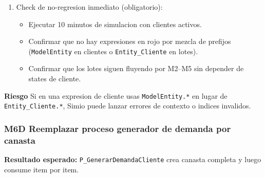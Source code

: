 \documentclass[11pt]{article}
\newcommand{\simio}[1]{\texttt{#1}}
\newcommand{\state}[1]{\texttt{#1}}
\newcommand{\proc}[1]{\texttt{#1}}
\newcommand{\risk}{\textcolor{rojoriesgo}{\textbf{Riesgo}}}
\begin{document}
\begin{enumerate}
\begin{itemize}
  \end{itemize}
  \item Check de no-regresion inmediato (obligatorio):
  \begin{itemize}
    \item Ejecutar 10 minutos de simulacion con clientes activos.
    \item Confirmar que no hay expresiones en rojo por mezcla de prefijos (\simio{ModelEntity} en clientes o \simio{Entity\_Cliente} en lotes).
    \item Confirmar que los lotes siguen fluyendo por M2--M5 sin depender de states de cliente.
  \end{itemize}
\end{enumerate}

\risk{} Si en una expresion de cliente usas \state{ModelEntity.*} en lugar de \state{Entity\_Cliente.*}, Simio puede lanzar errores de contexto o indices invalidos.

\subsubsection{M6D Reemplazar proceso generador de demanda por canasta}
\textbf{Resultado esperado:} \proc{P\_GenerarDemandaCliente} crea canasta completa y luego consume item por item.
\end{document}
